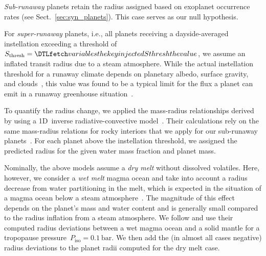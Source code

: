\documentclass[twocolumn,twocolappendix]{aastex631}
\begin{document}
\textit{Sub-runaway} planets retain the radius assigned based on exoplanet occurrence rates (see Sect.~\ref{sec:syn_planets}).
This case serves as our null hypothesis.

For \textit{super-runaway} planets, i.e., all planets receiving a dayside-averaged instellation exceeding a threshold of $S_\mathrm{thresh} = \var{injectedSthresh}$, we assume an inflated transit radius due to a steam atmosphere.
While the actual instellation threshold for a runaway climate depends on planetary albedo, surface gravity, and clouds~\citep{2019Icar..317..583P,Turbet2021,Pierrehumbert2022}, this value was found to be a typical limit for the flux a planet can emit in a runaway greenhouse situation~\citep{Goldblatt2013,Kopparapu2013,Leconte2013,Hamano2015,2017JGRE..122.1458S,2019ApJ...875...31K,Boukrouche2021,2021JGRE..12606711L}.

To quantify the radius change, we applied the mass-radius relationships derived by \citet{Turbet2020} using a 1D~inverse radiative-convective model~\citep{Turbet2019}.
Their calculations rely on the same mass-radius relations for rocky interiors that we apply for our sub-runaway planets~\citep{Zeng2016}.
For each planet above the instellation threshold, we assigned the predicted radius for the given water mass fraction and planet mass.

Nominally, the above models assume a \textit{dry melt} without dissolved volatiles.
Here, however, we consider a \textit{wet melt} magma ocean and take into account a radius decrease from water partitioning in the melt, which is expected in the situation of a magma ocean below a steam atmosphere~\citep{Dorn2021}.
The magnitude of this effect depends on the planet's mass and water content and is generally small compared to the radius inflation from a steam atmosphere.
We follow \citet{Dorn2021} and use their computed radius deviations between a wet magma ocean and a solid mantle for a tropopause pressure~$P_\mathrm{iso}=\SI{0.1}{\bar}$.
We then add the (in almost all cases negative) radius deviations to the planet radii computed for the dry melt case.
\end{document}
